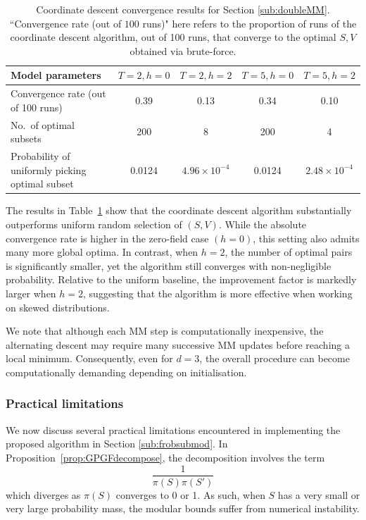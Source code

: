 \documentclass[EJP]{ejpecp} %
\begin{document}
\begin{table}
    \centering
    \small
    \begin{tabular}{|p{3.8cm}|c|c|c|c|}
        \hline
        \textbf{Model parameters} 
        & $T=2, h=0$ 
        & $T=2, h=2$ 
        & $T=5, h=0$ 
        & $T=5, h=2$ \\
        \hline
        
        Convergence rate (out of 100 runs) 
        & 0.39 & 0.13 & 0.34 & 0.10 \\
        \hline
        
        No.\ of optimal subsets 
        & 200 & 8 & 200 & 4 \\
        \hline
        
        Probability of uniformly picking optimal subset 
        & 0.0124 
        & $4.96\times10^{-4}$ 
        & 0.0124  
        & $2.48\times10^{-4}$ \\
        \hline
    \end{tabular}
    \caption{Coordinate descent convergence results for Section \ref{sub:doubleMM}. ``Convergence rate (out of $100$ runs)" here refers to the proportion of runs of the coordinate descent algorithm, out of 100 runs, that converge to the optimal $S,V$ obtained via brute-force.}
    \label{tab:doubleMM}
\end{table}

The results in Table~\ref{tab:doubleMM} show that the coordinate descent algorithm substantially outperforms uniform random selection of $(S,V)$. While the absolute convergence rate is higher in the zero-field case $(h=0)$, this setting also admits many more global optima. In contrast, when $h=2$, the number of optimal pairs is significantly smaller, yet the algorithm still converges with non-negligible probability. Relative to the uniform baseline, the improvement factor is markedly larger when $h=2$, suggesting that the algorithm is more effective when working on skewed distributions.

We note that although each MM step is computationally inexpensive, the alternating descent may require many successive MM updates before reaching a local minimum. Consequently, even for $d=3$, the overall procedure can become computationally demanding depending on initialisation.

\subsubsection{Practical limitations}
We now discuss several practical limitations encountered in implementing the proposed algorithm in Section \ref{sub:frobsubmod}. In Proposition~\ref{prop:GPGFdecompose}, the decomposition involves the term
$$\frac{1}{\pi(S)\pi(S')}$$
which diverges as $\pi(S)$ converges to 0 or 1. As such, when $S$ has a very small or very large probability mass, the modular bounds suffer from numerical instability. 
\end{document}
